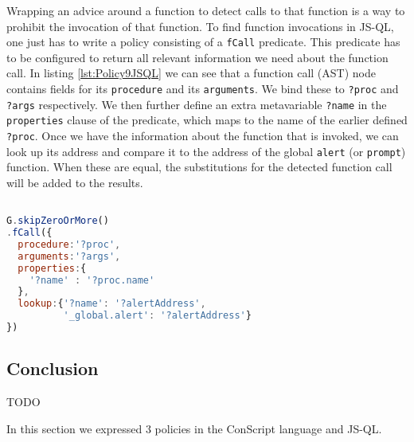 Wrapping an advice around a function to detect calls to that function is a way to prohibit the invocation of that function. To find function invocations in JS-QL, one just has to write a policy consisting of a \texttt{fCall} predicate. This predicate has to be configured to return all relevant information we need about the function call. In listing \ref{lst:Policy9JSQL} we can see that a function call (AST) node contains fields for its \texttt{procedure} and its \texttt{arguments}. We bind these to \texttt{?proc} and \texttt{?args} respectively. We then further define an extra metavariable \texttt{?name} in the \texttt{properties} clause of the predicate, which maps to the name of the earlier defined \texttt{?proc}. Once we have the information about the function that is invoked, we can look up its address and compare it to the address of the global \texttt{alert} (or \texttt{prompt}) function. When these are equal, the substitutions for the detected function call will be added to the results.

\begin{lstlisting}[label={lst:Policy9JSQL},language=JavaScript,caption=Policy 9 in JS-QL,mathescape=true]  % float=t?

G.skipZeroOrMore()
.fCall({
  procedure:'?proc',
  arguments:'?args',
  properties:{
    '?name' : '?proc.name'
  },
  lookup:{'?name': '?alertAddress',
          '_global.alert': '?alertAddress'}
})
\end{lstlisting}











\subsection{Conclusion}
TODO

In this section we expressed 3 policies in the ConScript language and JS-QL.

